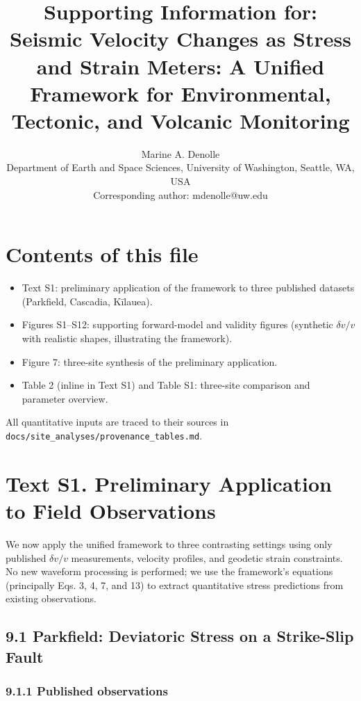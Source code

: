 \documentclass[12pt]{article}
\title{\textbf{Supporting Information for: Seismic Velocity Changes as
Stress and Strain Meters: A Unified Framework for Environmental,
Tectonic, and Volcanic Monitoring}}
\author{Marine A. Denolle\\
\small Department of Earth and Space Sciences, University of Washington,
Seattle, WA, USA\\
\small Corresponding author: mdenolle@uw.edu}
\date{}
\providecommand{\tightlist}{%
  \setlength{\itemsep}{0pt}\setlength{\parskip}{0pt}}
\begin{document}
\maketitle
\linenumbers

\section{Contents of this file}\label{contents-of-this-file}

\begin{itemize}
\tightlist
\item
  Text S1: preliminary application of the framework to three published
  datasets (Parkfield, Cascadia, Kīlauea).
\item
  Figures S1--S12: supporting forward-model and validity figures
  (synthetic \(\delta v/v\) with realistic shapes, illustrating the
  framework).
\item
  Figure 7: three-site synthesis of the preliminary application.
\item
  Table 2 (inline in Text S1) and Table S1: three-site comparison and
  parameter overview.
\end{itemize}

All quantitative inputs are traced to their sources in
\texttt{docs/site\_analyses/provenance\_tables.md}.

\clearpage

\section{Text S1. Preliminary Application to Field
Observations}\label{text-s1.-preliminary-application-to-field-observations}

We now apply the unified framework to three contrasting settings using
only published \(\delta v/v\) measurements, velocity profiles, and
geodetic strain constraints. No new waveform processing is performed; we
use the framework's equations (principally Eqs. 3, 4, 7, and 13) to
extract quantitative stress predictions from existing observations.

\subsection{9.1 Parkfield: Deviatoric Stress on a Strike-Slip
Fault}\label{parkfield-deviatoric-stress-on-a-strike-slip-fault}

\subsubsection{9.1.1 Published
observations}\label{published-observations}
\end{document}
